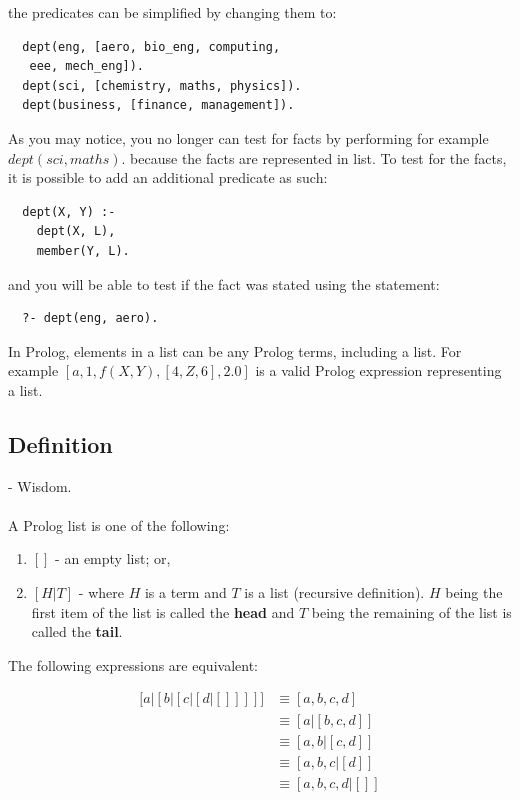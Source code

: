 \documentclass{article}
\begin{document}
\begin{multicols}{2}
  the predicates can be simplified by changing them to:
  
  \begin{lstlisting}
  dept(eng, [aero, bio_eng, computing,
   eee, mech_eng]).
  dept(sci, [chemistry, maths, physics]).
  dept(business, [finance, management]).
  \end{lstlisting}
  
  As you may notice, you no longer can test for facts by performing for example $dept(sci, maths).$ because the facts are represented in list. To test for the facts, it is possible to add an additional predicate as such:

  \begin{lstlisting}
  dept(X, Y) :-
    dept(X, L),
    member(Y, L).
  \end{lstlisting}
  
  and you will be able to test if the fact was stated using the statement:

  \begin{lstlisting}
  ?- dept(eng, aero).
  \end{lstlisting}
  
  In Prolog, elements in a list can be any Prolog terms, including a list. For example $[a, 1, f(X, Y), [4, Z, 6], 2.0]$ is a valid Prolog expression representing a list.
  
  \subsection{Definition}
  
   - Wisdom.
  
  \paragraph{} A Prolog list is one of the following:
  
  \begin{enumerate}
  \item $[]$ - an empty list; or,
  \item $[H|T]$ - where $H$ is a term and $T$ is a list (recursive definition). $H$ being the first item of the list is called the {\bf head} and $T$ being the remaining of the list is called the {\bf tail}.
  \end{enumerate}
  
  \noindent The following expressions are equivalent:
  
  \begin{equation*}
  \begin{aligned}
  \big [ a \vert [ b \vert [ c \vert [ d \vert []]]] \big] & \equiv [a,b,c,d] \\
  & \equiv [a|[b,c,d]] \\
  & \equiv [a,b|[c,d]] \\
  & \equiv [a,b,c|[d]] \\
  & \equiv [a,b,c,d|[]]
  \end{aligned}
  \end{equation*}  
  

\end{multicols}
\end{document}
